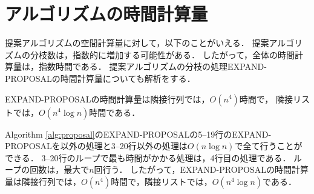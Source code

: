 \section{アルゴリズムの時間計算量}
\label{sec:alg-time}
提案アルゴリズムの空間計算量に対して，以下のことがいえる．
提案アルゴリズムの分枝数は，指数的に増加する可能性がある．
したがって，全体の時間計算量は，指数時間である．
提案アルゴリズムの分枝の処理EXPAND-PROPOSALの時間計算量についても解析をする．

\begin{theorem}
    EXPAND-PROPOSALの時間計算量は隣接行列では，$O(n^4)$時間で，
    隣接リストでは，$O(n^4 \log n )$時間である．
\end{theorem}

\begin{Proof*}
    Algorithm \ref{alg:proposal}のEXPAND-PROPOSALの5--19行のEXPAND-PROPOSALを以外の処理と3--20行以外の処理は$O(n\log n)$で全て行うことができる．
    3--20行のループで最も時間がかかる処理は，4行目の処理である．
    ループの回数は，最大で$n$回行う．
    したがって，EXPAND-PROPOSALの時間計算量は隣接行列では，$O(n^4)$時間で，隣接リストでは，$O(n^4\log n )$である．
\end{Proof*}

\begin{comment}
\begin{theorem}
    EXPAND-PROPOSALの時間計算量は，$O(n^3)$である．
    EXPAND-PROPOSALのを受け渡した親の部分グラフのサイズを$n_p$とすると，平均時間計算量は，$O(n_p^2)$である．
\end{theorem}
\begin{Proof*}
    NUMBER-SORT-Rの時間計算量は，$O(n^2)$である．
    EXPAND-PROPOSALのAlgorithm\ref{alg:proposal}の3--19行目までの処理で再帰のEXPAND-PROPOSALとNUMBER-SORT-R以外は，$O(n\log n)$で行える．
    EXPAND-PROPOSALアルゴリズムで最も時間がかかるステップは，NUMBER-SORT-Rである．
    これを最大で$n$回繰り返される．
    したがって，EXPAND-PROPOSALアルゴリズムの時間計算量は，$O(n^3)$である．
    各EXPANDに対して，NUMBER-SORT-Rは部分問題の子の数と分枝限定の条件で停止する1回分だけ行われる．
    NUMBER-SORT-Rは，各EXPAND-PROPOSALの先頭処理として部分グラフを彩色していると見れる．
    EXPAND-PROPOSALに対して，親サイズのNUMBER-SORT-Rと分枝限定の条件を確認するための2回行われると考えられる．
    ただし，NUMBER-SORT-Rは親のサイズで行われているのでEXPAND-PROPOSALアルゴリズムの平均時間計算量は$O(n_p^2)$である．

\end{Proof*}
\end{comment}

